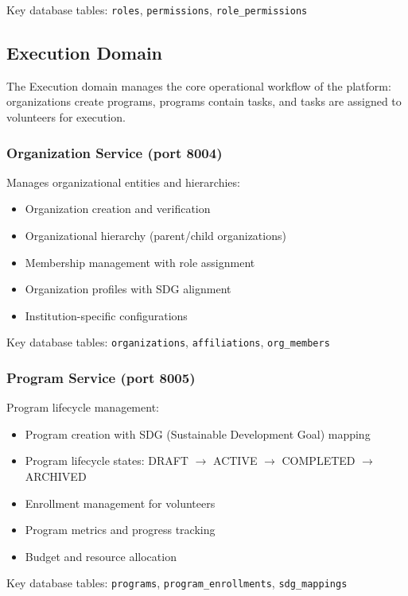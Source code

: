 Key database tables: \texttt{roles}, \texttt{permissions}, \texttt{role\_permissions}

\subsection{Execution Domain}

The Execution domain manages the core operational workflow of the platform: organizations create programs, programs contain tasks, and tasks are assigned to volunteers for execution.

\subsubsection{Organization Service (port 8004)}

Manages organizational entities and hierarchies:
\begin{itemize}
  \item Organization creation and verification
  \item Organizational hierarchy (parent/child organizations)
  \item Membership management with role assignment
  \item Organization profiles with SDG alignment
  \item Institution-specific configurations
\end{itemize}

Key database tables: \texttt{organizations}, \texttt{affiliations}, \texttt{org\_members}

\subsubsection{Program Service (port 8005)}

Program lifecycle management:
\begin{itemize}
  \item Program creation with SDG (Sustainable Development Goal) mapping
  \item Program lifecycle states: DRAFT $\rightarrow$ ACTIVE $\rightarrow$ COMPLETED $\rightarrow$ ARCHIVED
  \item Enrollment management for volunteers
  \item Program metrics and progress tracking
  \item Budget and resource allocation
\end{itemize}

Key database tables: \texttt{programs}, \texttt{program\_enrollments}, \texttt{sdg\_mappings}

